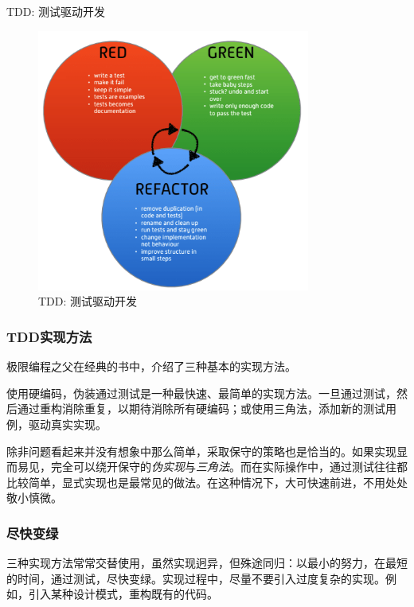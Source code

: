 \begin{content}
\begin{episode}{TDD: 测试驱动开发}
\begin{content}
\begin{figure}[H]
\centering
\includegraphics[width=0.8\textwidth]{figures/xunit/tdd-cycle.png}
\caption{TDD: 测试驱动开发}
 \label{fig:tdd-cycle}
\end{figure}

\subsubsection{TDD实现方法}

极限编程之父在经典的书中，介绍了三种基本的实现方法。

\begin{enum}
\end{enum}

使用硬编码，伪装通过测试是一种最快速、最简单的实现方法。一旦通过测试，然后通过重构消除重复，以期待消除所有硬编码；或使用三角法，添加新的测试用例，驱动真实实现。

除非问题看起来并没有想象中那么简单，采取保守的策略也是恰当的。如果实现显而易见，完全可以绕开保守的\emph{伪实现}与\emph{三角法}。而在实际操作中，通过测试往往都比较简单，显式实现也是最常见的做法。在这种情况下，大可快速前进，不用处处敬小慎微。

\subsubsection{尽快变绿}

三种实现方法常常交替使用，虽然实现迥异，但殊途同归：以最小的努力，在最短的时间，通过测试，尽快变绿。实现过程中，尽量不要引入过度复杂的实现。例如，引入某种设计模式，重构既有的代码。


\end{content}
\end{episode}
\end{content}

